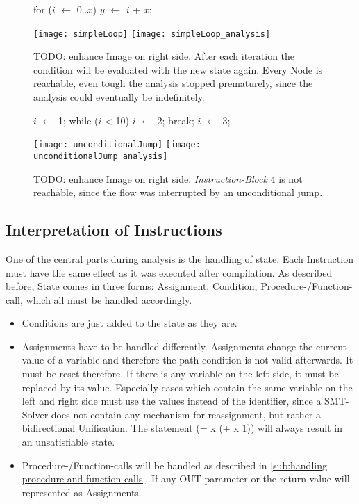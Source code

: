 \begin{figure}[!h]
	\begin{GenericCode}
		for ($i$ $\leftarrow$ 0..$x$) {
			$y$ $\leftarrow$ $i$ + $x$;
		}		
	\end{GenericCode}
	\centering
	\texttt{[image: simpleLoop]}
	\texttt{[image: simpleLoop\_analysis]}
	  \caption{TODO: enhance Image on right side. After each iteration the condition will be evaluated with the new state again. Every Node is reachable, even tough the analysis stopped prematurely, since the analysis could eventually be indefinitely. }
	\label{fig:simpleLoop}
\end{figure}

\begin{figure}[!h]
	\begin{GenericCode}
		$i$ $\leftarrow$ 1;
		while ($i$ < 10) {
			$i$ $\leftarrow$ 2;
			break;
			$i$ $\leftarrow$ 3;
		}
	\end{GenericCode}
	\centering
	\texttt{[image: unconditionalJump]}
	\texttt{[image: unconditionalJump\_analysis]}
	  \caption{TODO: enhance Image on right side. \emph{Instruction-Block} 4 is not reachable, since the flow was interrupted by an unconditional jump.}
	\label{fig:unconditionalJump}
\end{figure}

\subsection{Interpretation of Instructions}
\label{sub:Interpretation of Instructions}
One of the central parts during analysis is the handling of state. Each Instruction must have the same effect as it was executed after compilation. 
As described before, State comes in three forms: Assignment, Condition, Procedure-/Function-call, which all must be handled accordingly. 

\begin{itemize}
	\item Conditions are just added to the state as they are. 
	\item Assignments have to be handled differently. Assignments change the current value of a variable and therefore the path condition is not valid afterwards. It must be reset therefore. 
		If there is any variable on the left side, it must be replaced by its value. Especially cases which contain the same variable on the left and right side must use the values instead of the identifier, since a SMT-Solver does not contain any mechanism for reassignment, but rather a bidirectional Unification. The statement (= x (+ x 1)) will always result in an unsatisfiable state.
	\item Procedure-/Function-calls will be handled as described in \ref{sub:handling procedure and function calls}. If any OUT parameter or the return value will represented as Assignments. 
\end{itemize}

